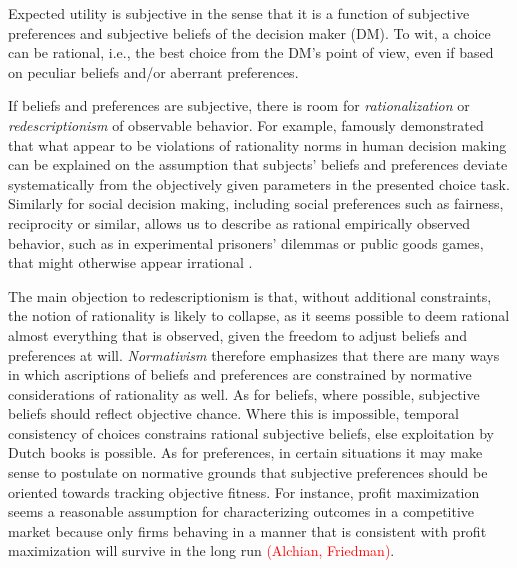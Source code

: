 \documentclass[fleqn,reqno,11pt]{article}
\newcommand{\myalert}[1]{\textcolor{red}{#1}}
\begin{document}
\noindent Expected utility is subjective in the sense that it is a function of subjective
preferences and subjective beliefs of the decision maker (DM). To wit, a choice can be
rational, i.e., the best choice from the DM's point of view, even if based on peculiar beliefs
and/or aberrant preferences. %

If beliefs and preferences are subjective, there is room for \emph{rationalization} or
\emph{redescriptionism} of observable behavior. For example,
\citet{KahnemannTversky1979:Prospect-Theory} famously demonstrated that what appear to be
violations of rationality norms in human decision making can be explained on the assumption
that subjects' beliefs and preferences deviate systematically from the objectively given
parameters in the presented choice task. Similarly for social decision making, including social
preferences such as fairness, reciprocity or similar, allows us to describe as rational
empirically observed behavior, such as in experimental prisoners' dilemmas or public goods
games, that might otherwise appear irrational \citep[e.g.,][]{fehrschmidt99,charrab02}.

The main objection to redescriptionism is that, without additional constraints, the notion of
rationality is likely to collapse, as it seems possible to deem rational almost everything that
is observed, given the freedom to adjust beliefs and preferences at will. \emph{Normativism}
therefore emphasizes that there are many ways in which ascriptions of beliefs and preferences
are constrained by normative considerations of rationality as well. As for beliefs, where
possible, subjective beliefs should reflect objective chance. Where this is impossible,
temporal consistency of choices constrains rational subjective beliefs, else exploitation by
Dutch books is possible. As for preferences, in certain situations it may make sense to
postulate on normative grounds that subjective preferences should be oriented towards tracking
objective fitness. For instance, profit maximization seems a reasonable assumption for
characterizing outcomes in a competitive market because only firms behaving in a manner that is
consistent with profit maximization will survive in the long run \myalert{(Alchian,
  Friedman)}.
\end{document}
